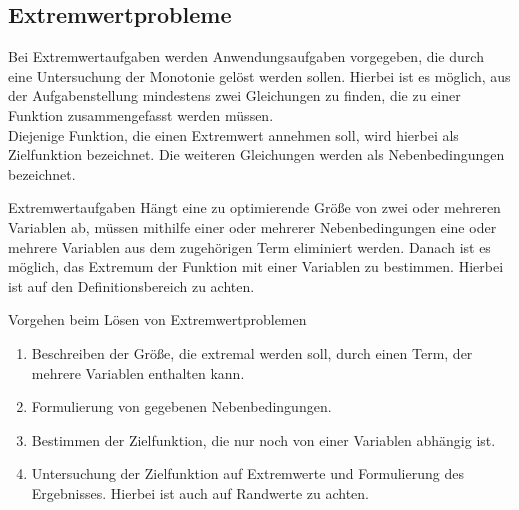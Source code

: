  \subsection{Extremwertprobleme}
 Bei Extremwertaufgaben werden Anwendungsaufgaben vorgegeben, die durch eine Untersuchung der Monotonie gelöst werden sollen. Hierbei ist es möglich, aus der Aufgabenstellung mindestens zwei Gleichungen zu finden, die zu einer Funktion zusammengefasst werden müssen.\\
 Diejenige Funktion, die einen Extremwert annehmen soll, wird hierbei als Zielfunktion bezeichnet. Die weiteren Gleichungen werden als Nebenbedingungen bezeichnet.
 \begin{satz}{Extremwertaufgaben}{}
Hängt eine zu optimierende Größe von zwei oder mehreren Variablen ab, müssen mithilfe einer oder mehrerer Nebenbedingungen eine oder mehrere Variablen aus dem zugehörigen Term eliminiert werden. Danach ist es möglich, das Extremum der Funktion mit einer Variablen zu bestimmen. Hierbei ist auf den Definitionsbereich zu achten.
 \end{satz}
 \begin{b8d}{Vorgehen beim Lösen von Extremwertproblemen}{}
\begin{enumerate}
    \item Beschreiben der Größe, die extremal werden soll, durch einen Term, der mehrere Variablen enthalten kann.
    \item Formulierung von gegebenen Nebenbedingungen.
    \item Bestimmen der Zielfunktion, die nur noch von einer Variablen abhängig ist.
    \item Untersuchung der Zielfunktion auf Extremwerte und Formulierung des Ergebnisses. Hierbei ist auch auf Randwerte zu achten.
\end{enumerate}
 \end{b8d}
